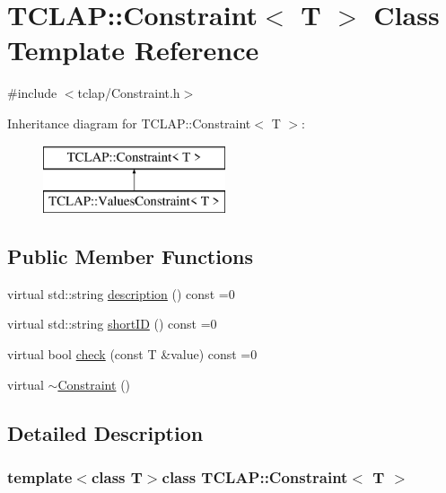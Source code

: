 \hypertarget{class_t_c_l_a_p_1_1_constraint}{}\section{T\+C\+L\+A\+P\+:\+:Constraint$<$ T $>$ Class Template Reference}
\label{class_t_c_l_a_p_1_1_constraint}


{\ttfamily \#include $<$tclap/\+Constraint.\+h$>$}

Inheritance diagram for T\+C\+L\+A\+P\+:\+:Constraint$<$ T $>$\+:\begin{figure}[H]
\begin{center}
\leavevmode
\includegraphics[height=2.000000cm]{class_t_c_l_a_p_1_1_constraint}
\end{center}
\end{figure}
\subsection*{Public Member Functions}
\begin{DoxyCompactItemize}
\item 
virtual std\+::string \hyperlink{class_t_c_l_a_p_1_1_constraint_a77a9676c8deb6714e14d593705ec9a5b}{description} () const  =0
\item 
virtual std\+::string \hyperlink{class_t_c_l_a_p_1_1_constraint_a1a08f9b01dfdcceef61015c64b1e9187}{short\+I\+D} () const  =0
\item 
virtual bool \hyperlink{class_t_c_l_a_p_1_1_constraint_ac6f2532fdfb962949fa5d509d42eaec8}{check} (const T \&value) const  =0
\item 
virtual \hyperlink{class_t_c_l_a_p_1_1_constraint_ae96bbe5301e9517b68b1597b36098224}{$\sim$\+Constraint} ()
\end{DoxyCompactItemize}


\subsection{Detailed Description}
\subsubsection*{template$<$class T$>$class T\+C\+L\+A\+P\+::\+Constraint$<$ T $>$}

